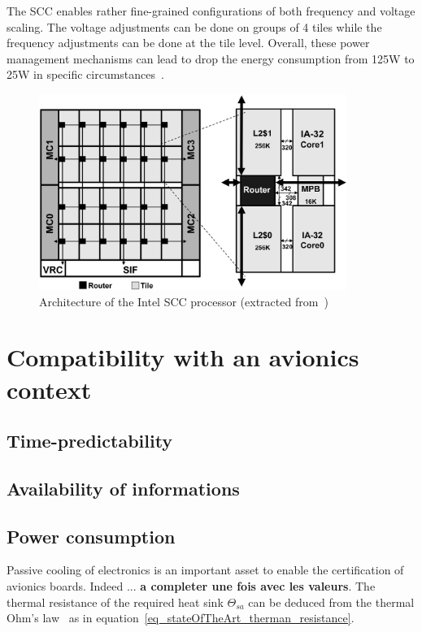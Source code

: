 \documentclass[main.tex]{subfiles}
\begin{document}
The SCC enables rather fine-grained configurations of both frequency and voltage scaling. The voltage adjustments can be done on groups of 4 tiles while the frequency adjustments can be done at the tile level. Overall, these power management mechanisms can lead to drop the energy consumption from 125W to 25W in specific circumstances~\cite{Howard2010}.


\begin{figure}
    \centering
    \includegraphics[width=10cm]{imgs/png/stateOfTheArt_IntelSCC_overview.png}
    \caption{Architecture of the Intel SCC processor (extracted from~\cite{Howard2010})}
    \label{fig_stateOfTheArt_IntelSCC_overview}
\end{figure}






\section{Compatibility with an avionics context}
\subsection{Time-predictability}
\subsection{Availability of informations}
\subsection{Power consumption}
Passive cooling of electronics is an important asset to enable the certification of avionics boards. Indeed ... \textbf{a completer une fois avec les valeurs}.
The thermal resistance of the required heat sink $\Theta_{sa}$ can be deduced from the thermal Ohm's law~\cite{Edmunds_heatsinks} as in equation~\ref{eq_stateOfTheArt_therman_resistance}.
\end{document}
